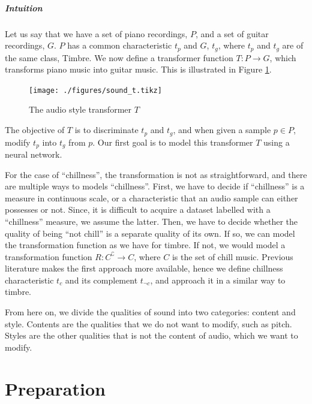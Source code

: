\documentclass[12pt,a4paper,]{report}
\begin{document}
\paragraph{Intuition}

Let us say that we have a set of piano recordings, \(P\), and a set of
guitar recordings, \(G\). \(P\) has a common characteristic \(t_p\) and
\(G\), \(t_g\), where \(t_p\) and \(t_g\) are of the same class, Timbre.
We now define a transformer function \(T: P \rightarrow G\), which
transforms piano music into guitar music. This is illustrated in Figure
\ref{fig:t}.

\begin{figure}
    \texttt{[image: ./figures/sound\_t.tikz]}
    \centering
    \caption{The audio style transformer $T$} \label{fig:t}
\end{figure}

The objective of \(T\) is to discriminate \(t_p\) and \(t_g\), and when
given a sample \(p \in P\), modify \(t_p\) into \(t_g\) from \(p\). Our
first goal is to model this transformer \(T\) using a neural network.

For the case of ``chillness'', the transformation is not as
straightforward, and there are multiple ways to models ``chillness''.
First, we have to decide if ``chillness'' is a measure in continuous
scale, or a characteristic that an audio sample can either possesses or
not. Since, it is difficult to acquire a dataset labelled with a
``chillness'' measure, we assume the latter. Then, we have to decide
whether the quality of being ``not chill'' is a separate quality of its
own. If so, we can model the transformation function as we have for
timbre. If not, we would model a transformation function
\(R: C^\complement \rightarrow C\), where \(C\) is the set of chill
music. Previous literature makes the first approach more available,
hence we define chillness characteristic \(t_c\) and its complement
\(t_{\lnot c}\), and approach it in a similar way to timbre.

From here on, we divide the qualities of sound into two categories:
content and style. Contents are the qualities that we do not want to
modify, such as pitch. Styles are the other qualities that is not the
content of audio, which we want to modify.

\hypertarget{preparation}{%
\chapter{Preparation}\label{preparation}}
\end{document}
